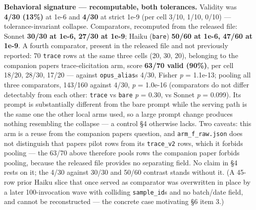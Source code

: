 \textbf{Behavioral signature --- recomputable, both tolerances.} Validity was \textbf{4/30 (13\%)} at 1e-6 and \textbf{4/30} at strict 1e-9 (per cell 3/10, 1/10, 0/10) --- tolerance-invariant collapse. Comparators, recomputed from the released file: Sonnet \textbf{30/30 at 1e-6, 27/30 at 1e-9}; Haiku (\texttt{bare}) \textbf{50/60 at 1e-6, 47/60 at 1e-9}. A fourth comparator, present in the released file and not previously reported: 70 \texttt{trace} rows at the same three cells (20, 30, 20), belonging to the companion paper\textquotesingle s trace-elicitation arm, score \textbf{63/70 valid (90\%)}, per cell 18/20, 28/30, 17/20 --- against \texttt{opus\_alias}\textquotesingle s 4/30, Fisher \emph{p} = 1.1e-13; pooling all three comparators, 143/160 against 4/30, \emph{p} = 1.0e-16 (comparators do not differ detectably from each other: \texttt{trace} vs \texttt{bare} \emph{p} = 0.30, vs Sonnet \emph{p} = 0.099). Its prompt is substantially different from the bare prompt while the serving path is the same one the other local arms used, so a large prompt change produces nothing resembling the collapse --- a control §4 otherwise lacks. Two caveats: this arm is a reuse from the companion paper\textquotesingle s question, and \texttt{arm\_f\_raw.json} does not distinguish that paper\textquotesingle s pilot rows from its \texttt{trace\_v2} rows, which it forbids pooling --- the 63/70 above therefore pools rows the companion paper forbids pooling, because the released file provides no separating field. No claim in §4 rests on it; the 4/30 against 30/30 and 50/60 contrast stands without it. (A 45-row prior Haiku slice that once served as comparator was overwritten in place by a later 100-invocation wave with colliding \texttt{sample\_id}s and no batch/date field, and cannot be reconstructed --- the concrete case motivating §6 item 3.)

